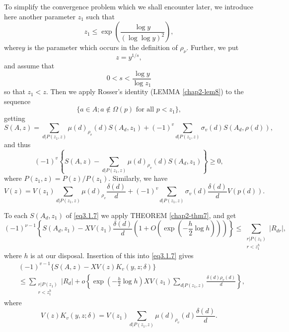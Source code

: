 To simplify the convergence problem which we shall encounter later, we
introduce here another parameter $z_1$ such that  
\begin{equation*}
  z_1 \le \exp\left(\frac{\log y}{(\log \log y)^2 }\right),
  \tag{3.1.5}\label{eq3.1.5} 
\end{equation*}
where\pageoriginale $y$ is the parameter which occurs in the definition of
$\rho_\nu$. Further, we put 
$$
z=y^{1/s},
$$
and assume that 
\begin{equation*}
  0<s< \frac{\log y}{\log z_1} \tag{3.1.6}\label{eq3.1.6}
\end{equation*}
so that $z_1 <z$. Then we apply Rosser's identity (LEMMA \ref{chap2-lem8}) to the
sequence 
$$
\{ a \in A; a \not\in  \Omega (p) \text{ for all } p< z_1 \},
$$
getting
$$
S(A,z)= \sum_{d|P(z_1,z)} \mu (d)_{\rho_ v} (d)S (A_d,z_1)+ (-1)^v
\sum _{d|P(z_1,z)} \sigma_v (d) S (A_d, \rho (d)), 
$$
and thus
\begin{equation*}
(-1)^v \left\{ S(A,z)-\sum_{d|P(z_1,z)}\mu (d)_{\rho_ v} (d)S (A_d,z_1) \right\}
  \ge 0, \tag{3.1.7}  \label{eq3.1.7}
\end{equation*}
where $P(z_1,z) = P(z)/ P(z_1)$. Similarly, we have
\begin{equation*}
V(z)=V(z_1)\sum_{d|P(z_1,z)}\mu (d)_{\rho_ v} \frac{\delta(d)}{d} 
  + (-1)^v \sum_{d|P(z_1,z)} \sigma_v (d)\frac{\delta(d)}{d}
  V(p(d)). \tag{3.1.8}\label{eq3.1.8}
\end{equation*}

To each $S(A_d,z_1)$ of \eqref{eq3.1.7} we apply THEOREM
\ref{chap2-thm7}, and get 
{\fontsize{10pt}{12pt}\selectfont
$$
(-1)^{\nu-1} \left\{ S(A_d, z_1)- XV(z_1)\frac{\delta(d)}{d} \left(1+ O
\left(\exp \left(- \frac{h}{2} \log h\right)\right)\right) \right\} 
\le \sum _{\substack {r|P(z_1)\\{r <z^h_1}}}|R_{dr}|,
$$}\relax\pageoriginale
where $h$ is at our disposal. Insertion of this into \eqref{eq3.1.7} gives
\begin{align*}
& (-1)^{v-1} \{ S(A,z)-XV (z)K_v (y,z; \delta) \}\\
& \le \sum _{\substack {r|P(z_1)\\{r <z^h_1}}}|R_{d}|+ o\left\{ \exp \left(-
\frac{h}{2} \log h\right) XV (z_1) \sum _{d|P(z_1,z)} \frac{\delta (d)\rho_v
  (d)}{d} \right \},\tag{3.1.9}\label{eq3.1.9}
\end{align*}
where
\begin{equation*}
V(z)K_v (y,z; \delta)= V(z_1) \sum_{{d|P(z_1,z)}} \mu (d)_{\rho_v} (d)
\frac{\delta (d)}{d}. \tag{3.1.10}\label{eq3.1.10} 
\end{equation*}
 

